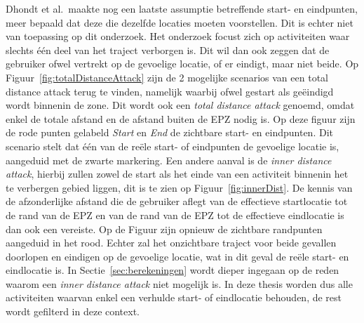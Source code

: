 Dhondt et al.\ maakte nog een laatste assumptie betreffende start- en
eindpunten, meer bepaald dat deze die dezelfde locaties moeten voorstellen. Dit
is echter niet van toepassing op dit onderzoek. Het onderzoek focust zich op
activiteiten waar slechts één deel van het traject verborgen is. Dit wil dan
ook zeggen dat de gebruiker ofwel vertrekt op de gevoelige locatie, of er
eindigt, maar niet beide. Op Figuur~\ref{fig:totalDistanceAttack} zijn de 2
mogelijke scenarios van een total distance attack terug te vinden, namelijk
waarbij ofwel gestart als geëindigd wordt binnenin de zone. Dit wordt ook een
\textit{total distance attack} genoemd, omdat enkel de totale afstand en de
afstand buiten de \ac{EPZ} nodig is. Op deze figuur zijn de rode punten
gelabeld \textit{Start} en \textit{End} de zichtbare start- en eindpunten. Dit
scenario stelt dat één van de reële start- of eindpunten de gevoelige locatie
is, aangeduid met de zwarte markering. Een andere aanval is de \textit{inner
    distance attack}, hierbij zullen zowel de start als het einde van een
activiteit binnenin het te verbergen gebied liggen, dit is te zien op
Figuur~\ref{fig:innerDist}. De kennis van de afzonderlijke afstand die de
gebruiker aflegt van de effectieve startlocatie tot de rand van de \ac{EPZ} en
van de rand van de \ac{EPZ} tot de effectieve eindlocatie is dan ook een
vereiste. Op de Figuur zijn opnieuw de zichtbare randpunten aangeduid in het
rood. Echter zal het onzichtbare traject voor beide gevallen doorlopen en
eindigen op de gevoelige locatie, wat in dit geval de reële start- en
eindlocatie is. In Sectie~\ref{sec:berekeningen} wordt dieper ingegaan op de
reden waarom een \textit{inner distance attack} niet mogelijk is. In deze
thesis worden dus alle activiteiten waarvan enkel een verhulde start- of
eindlocatie behouden, de rest wordt gefilterd in deze context.
